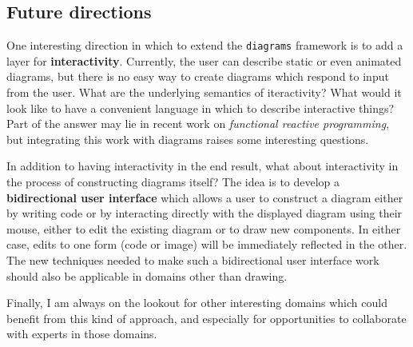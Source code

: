 \documentclass[12pt]{article}
\begin{document}
\subsection*{Future directions}

One interesting direction in which to extend the \texttt{diagrams}
framework is to add a layer for \textbf{interactivity}.  Currently,
the user can describe static or even animated diagrams, but there is
no easy way to create diagrams which respond to input from the user.
What are the underlying semantics of iteractivity?  What would it
look like to have a convenient language in which to describe
interactive things?  Part of the answer may lie in recent work on
\emph{functional reactive programming}, but integrating this work with
diagrams raises some interesting questions.

In addition to having interactivity in the end result, what about
interactivity in the process of constructing diagrams itself?  The
idea is to develop a \textbf{bidirectional user interface} which
allows a user to construct a diagram either by writing code or by
interacting directly with the displayed diagram using their mouse,
either to edit the existing diagram or to draw new components.  In
either case, edits to one form (code or image) will be immediately
reflected in the other.  The new techniques needed to make such a
bidirectional user interface work should also be applicable in domains
other than drawing.

Finally, I am always on the lookout for other interesting domains
which could benefit from this kind of approach, and especially for
opportunities to collaborate with experts in those domains.
\end{document}
